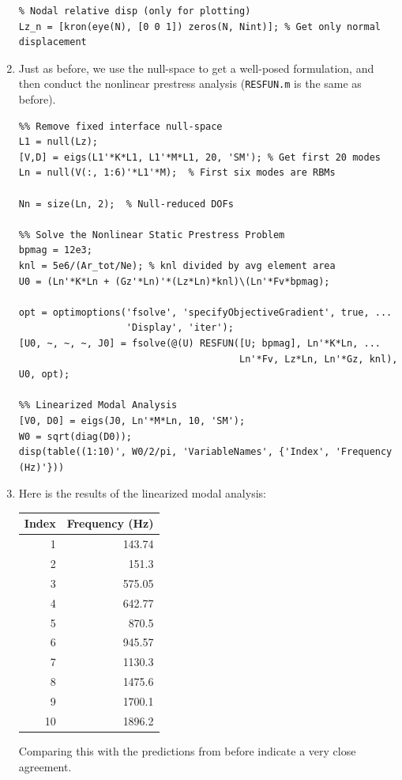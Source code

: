 \documentclass[11pt]{article}
\begin{document}
\begin{enumerate}
\begin{verbatim}
% Nodal relative disp (only for plotting)
Lz_n = [kron(eye(N), [0 0 1]) zeros(N, Nint)]; % Get only normal displacement
\end{verbatim}
\item Just as before, we use the null-space to get a well-posed formulation, and then conduct the nonlinear prestress analysis (\texttt{RESFUN.m} is the same as before).
\begin{verbatim}
%% Remove fixed interface null-space
L1 = null(Lz);
[V,D] = eigs(L1'*K*L1, L1'*M*L1, 20, 'SM'); % Get first 20 modes
Ln = null(V(:, 1:6)'*L1'*M);  % First six modes are RBMs

Nn = size(Ln, 2);  % Null-reduced DOFs

%% Solve the Nonlinear Static Prestress Problem
bpmag = 12e3;
knl = 5e6/(Ar_tot/Ne); % knl divided by avg element area
U0 = (Ln'*K*Ln + (Gz'*Ln)'*(Lz*Ln)*knl)\(Ln'*Fv*bpmag);

opt = optimoptions('fsolve', 'specifyObjectiveGradient', true, ...
                   'Display', 'iter');
[U0, ~, ~, ~, J0] = fsolve(@(U) RESFUN([U; bpmag], Ln'*K*Ln, ...
                                       Ln'*Fv, Lz*Ln, Ln'*Gz, knl), U0, opt);

%% Linearized Modal Analysis
[V0, D0] = eigs(J0, Ln'*M*Ln, 10, 'SM');
W0 = sqrt(diag(D0));
disp(table((1:10)', W0/2/pi, 'VariableNames', {'Index', 'Frequency (Hz)'}))
\end{verbatim}
\item Here is the results of the linearized modal analysis:   
\begin{center}
\begin{tabular}{rr}
Index & Frequency (Hz)\\[0pt]
\hline
1 & 143.74\\[0pt]
2 & 151.3\\[0pt]
3 & 575.05\\[0pt]
4 & 642.77\\[0pt]
5 & 870.5\\[0pt]
6 & 945.57\\[0pt]
7 & 1130.3\\[0pt]
8 & 1475.6\\[0pt]
9 & 1700.1\\[0pt]
10 & 1896.2\\[0pt]
\end{tabular}
\end{center}
Comparing this with the predictions from before indicate a very close agreement.
\end{enumerate}
\end{document}
